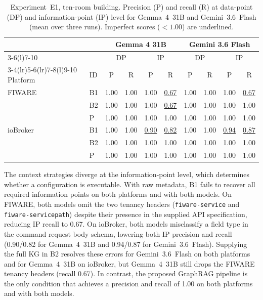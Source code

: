 \documentclass[twocolumn, 10pt, a4paper]{article}
\begin{document}
\begin{table}[t]
    \caption{Experiment~E1, ten-room building. Precision (P) and recall (R) at data-point (DP) and information-point (IP) level for Gemma~4~31B and Gemini~3.6~Flash (mean over three runs). Imperfect scores ($<1.00$) are underlined.}
    \label{tab:base}
    \centering\footnotesize
    \setlength{\tabcolsep}{2.5pt}
    \begin{tabular}{@{}llcccccccc@{}}
        \toprule
        & & \multicolumn{4}{c}{Gemma 4 31B} & \multicolumn{4}{c}{Gemini 3.6 Flash} \\
        \cmidrule(lr){3-6}\cmidrule(l){7-10}
        & & \multicolumn{2}{c}{DP} & \multicolumn{2}{c}{IP} & \multicolumn{2}{c}{DP} & \multicolumn{2}{c}{IP} \\
        \cmidrule(lr){3-4}\cmidrule(lr){5-6}\cmidrule(lr){7-8}\cmidrule(l){9-10}
        Platform & ID & P    & R    & P                & R                & P    & R    & P                & R                \\
        \midrule
        FIWARE   & B1 & 1.00 & 1.00 & 1.00             & \underline{0.67} & 1.00 & 1.00 & 1.00             & \underline{0.67} \\
        & B2 & 1.00 & 1.00 & 1.00             & \underline{0.67} & 1.00 & 1.00 & 1.00             & 1.00             \\
        & P  & 1.00 & 1.00 & 1.00             & 1.00             & 1.00 & 1.00 & 1.00             & 1.00             \\
        \midrule
        ioBroker & B1 & 1.00 & 1.00 & \underline{0.90} & \underline{0.82} & 1.00 & 1.00 & \underline{0.94}  & \underline{0.87}  \\
        & B2 & 1.00 & 1.00 & 1.00             & 1.00             & 1.00 & 1.00 & 1.00             & 1.00             \\
        & P  & 1.00 & 1.00 & 1.00             & 1.00             & 1.00 & 1.00 & 1.00             & 1.00             \\
        \bottomrule
    \end{tabular}
\end{table}

The context strategies diverge at the information-point level, which determines whether a configuration is executable.
With raw metadata, B1 fails to recover all required information points on both platforms and with both models.
On FIWARE, both models omit the two tenancy headers (\texttt{fiware-service} and \texttt{fiware-servicepath}) despite their presence in the supplied API specification, reducing IP recall to 0.67.
On ioBroker, both models misclassify a field type in the command request body schema, lowering both IP precision and recall (0.90/0.82 for Gemma~4~31B and 0.94/0.87 for Gemini~3.6~Flash).
Supplying the full KG in B2 resolves these errors for Gemini~3.6~Flash on both platforms and for Gemma~4~31B on ioBroker, but Gemma~4~31B still drops the FIWARE tenancy headers (recall 0.67).
In contrast, the proposed GraphRAG pipeline is the only condition that achieves a precision and recall of 1.00 on both platforms and with both models.
\end{document}
